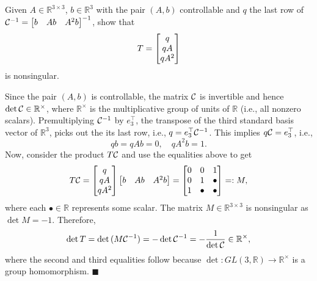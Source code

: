 \question Given $A \in \mathbb{R}^{3 \times 3}$, $b \in \mathbb{R}^3$ with the
pair $(A,b)$ controllable and $q$ the last row of $\mathcal{C}^{-1} = \begin{bmatrix}b & Ab &
A^2b\end{bmatrix}^{-1}$, show that \[ T = \begin{bmatrix}q \\ qA \\ qA^2\end{bmatrix} \] is nonsingular.

\begin{solution}
%
Since the pair $(A,b)$ is controllable, the matrix $\mathcal{C}$ is invertible and
hence $\det{\mathcal{C}} \in \mathbb{R}^\times$, where $\mathbb{R}^\times$ is the
multiplicative group of units of $\mathbb{R}$ (i.e., all nonzero scalars).
Premultiplying $\mathcal{C}^{-1}$ by $e_3^\top$, the transpose of the third standard
basis vector of $\mathbb{R}^3$, picks out the its last row, i.e., $q = e_3^\top
\mathcal{C}^{-1}$. This implies $q \mathcal{C} = e_3^\top$, i.e.,
%
\[
    qb = qAb = 0, \quad qA^2b = 1.
\]
Now, consider the product $T\mathcal{C}$ and use the equalities above to get
\[
    T\mathcal{C} = \begin{bmatrix}q \\ qA \\ qA^2\end{bmatrix}\begin{bmatrix}b & Ab & A^2b\end{bmatrix} = 
    \begin{bmatrix}0 & 0 & 1 \\ 0 & 1 & \bullet \\ 1 & \bullet & \bullet\end{bmatrix} =: M,
\]
where each $\bullet \in \mathbb{R}$ represents some scalar. The matrix $M \in
\mathbb{R}^{3 \times 3}$ is nonsingular as  $\det{M} = -1$. Therefore, 
\[ \det{T} = \det{(M\mathcal{C}^{-1})} = -\det{\mathcal{C}^{-1}} = -\frac{1}{\det{\mathcal{C}}}
\in \mathbb{R}^\times, \] where the second and third equalities follow because
$\det: GL(3,\mathbb{R}) \rightarrow \mathbb{R}^\times$ is a group homomorphism.
\hfill $\blacksquare$
%
\end{solution}